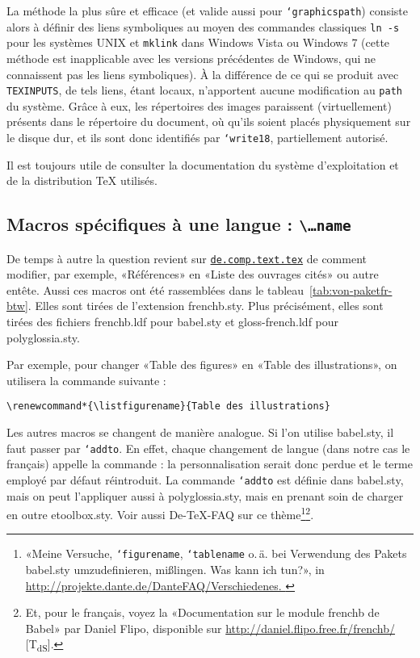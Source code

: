 \documentclass[fontsize=11pt, paper=a4, pagesize, captions=tableheading, numbers=enddot, toc=graduated, footnotes=multiple]{scrartcl}%
\newcommand{\News}[1]{\href{news:#1}{\texttt{#1}}}
\newcommand{\News}[1]{\href{news:#1}{\texttt{#1}}}
\DeclareRobustCommand*{\Macro}[1]{\mbox{\texttt{\char`\\#1}}}
\newcommand{\Doku}[1]{\textsf{#1}\xspace}
\newcommand{\Paket}[1]{\textsf{#1.sty}\xspace}
\newcommand{\TB}{\textbackslash}
\newcommand{\NDT}{[T\textsubscript{dS}].} %
\begin{document}
La méthode la plus sûre et efficace (et valide aussi pour \Macro{graphicspath}) consiste alors à définir des liens symboliques au moyen des commandes classiques \texttt{ln\,-s} pour les systèmes UNIX et \texttt{mklink} dans Windows Vista ou Windows 7 (cette méthode est inapplicable avec les versions précédentes de Windows, qui ne connaissent pas les liens symboliques). À la différence de ce qui se produit avec \texttt{TEXINPUTS}, de tels liens, étant locaux, n’apportent aucune modification au \texttt{path} du système. Grâce à eux, les répertoires des images paraissent (virtuellement) présents dans le répertoire du document, où qu’ils soient placés physiquement sur le disque dur, et ils sont donc identifiés par \Macro{write18}, partiellement autorisé.

Il est toujours utile de consulter la documentation du système d’exploitation et de la distribution \TeX{} utilisés.

\subsection{Macros spécifiques à une langue : \texttt{\TB…name}}
\label{sec:die-macroname-makros}

De temps à autre la question revient sur \News{de.comp.text.tex} de comment modifier, par exemple, «Références» en «Liste des ouvrages cités» ou autre entête. Aussi ces macros ont été rassemblées dans le tableau~\vref{tab:von-paketfr-btw}. Elles sont tirées de l'extension \Paket{frenchb}. Plus précisément, elles sont tirées des fichiers \textsf{frenchb.ldf} pour \Paket{babel} et \textsf{gloss-french.ldf} pour \Paket{polyglossia}.

Par exemple, pour changer «Table des figures» en «Table des illustrations», on utilisera la commande suivante :
\begin{verbatim}
\renewcommand*{\listfigurename}{Table des illustrations}
\end{verbatim}

Les autres macros se changent de manière analogue. Si l’on utilise \Paket{babel}, il faut passer par \Macro{addto}. En effet, chaque changement de langue (dans notre cas le français) appelle la commande \captionsfrench : la personnalisation serait donc perdue et le terme employé par défaut réintroduit. La commande \Macro{addto} est définie dans \Paket{babel}, mais on peut l’appliquer aussi à \Paket{polyglossia}, mais en prenant soin de charger en outre \Paket{etoolbox}. Voir aussi \Doku{De-TeX-FAQ}sur ce thème\footnote{«Meine Versuche, \Macro{figurename}, \Macro{tablename} o.\,ä. bei Verwendung des Pakets \Paket{babel} umzudefinieren, mißlingen. Was kann ich tun?», in \url{http://projekte.dante.de/DanteFAQ/Verschiedenes. }}\footnote{Et, pour le français, voyez la «Documentation sur le module frenchb de Babel» par Daniel Flipo, disponible sur \url{http://daniel.flipo.free.fr/frenchb/} \NDT}.
\end{document}
